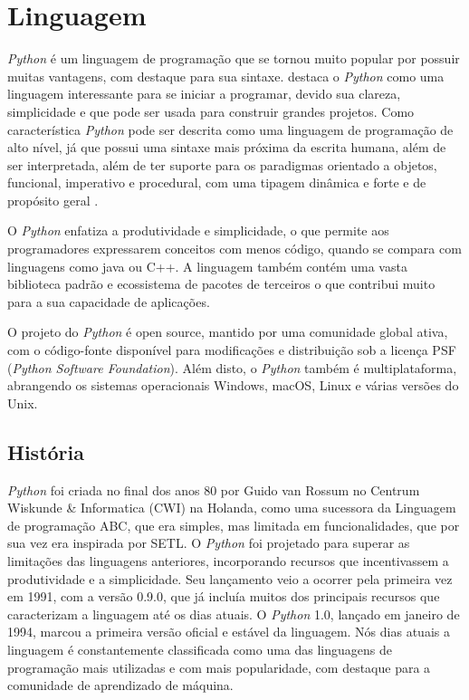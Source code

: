 \section{Linguagem}
\indent \textit{Python} é um linguagem de programação que se tornou muito popular por possuir muitas vantagens, com destaque para sua sintaxe. \cite{menezes2010introduccao} destaca o \textit{Python} como uma linguagem interessante para se iniciar a programar, devido sua clareza, simplicidade e que pode ser usada para construir grandes projetos. Como característica \textit{Python} pode ser descrita como uma linguagem de programação de alto nível, já que possui uma sintaxe mais próxima da escrita humana, além de ser interpretada, além de ter suporte para os paradigmas orientado a objetos, funcional, imperativo e procedural, com uma tipagem dinâmica e forte e de propósito geral \cite{wiki:python}.

O \textit{Python} enfatiza a produtividade e simplicidade, o que permite aos programadores expressarem conceitos com menos código, quando se compara com linguagens como java ou C++. A linguagem também contém uma vasta biblioteca padrão e ecossistema de pacotes de terceiros o que contribui muito para a sua capacidade de aplicações.\cite{wiki:python}

O projeto do \textit{Python} é open source, mantido por uma comunidade global ativa, com o código-fonte disponível para modificações e distribuição sob a licença PSF (\textit{Python Software Foundation}). Além disto, o \textit{Python} também é multiplataforma, abrangendo os sistemas operacionais Windows, macOS, Linux e várias versões do Unix.\cite{wiki:python}

\subsection{História}

\indent \textit{Python} foi criada no final dos anos 80 por Guido van Rossum no Centrum Wiskunde \& Informatica (CWI) na Holanda, como uma sucessora da Linguagem de programação ABC, que era simples, mas limitada em funcionalidades, que por sua vez era inspirada por SETL. O \textit{Python} foi projetado para superar as limitações das linguagens anteriores, incorporando recursos que incentivassem a produtividade e a simplicidade. Seu lançamento veio a ocorrer pela primeira vez em 1991, com a versão 0.9.0, que já incluía muitos dos principais recursos que caracterizam a linguagem até os dias atuais. O \textit{Python} 1.0, lançado em janeiro de 1994, marcou a primeira versão oficial e estável da linguagem.\cite{wiki:python}  Nós dias atuais a linguagem é constantemente classificada como uma das linguagens de programação mais utilizadas e com mais popularidade, com destaque para a comunidade de aprendizado de máquina. \cite{wiki:python}